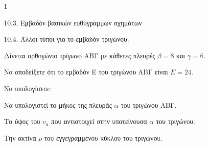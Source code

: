 \begin{ylh}{1}
    \item 10.3. Εμβαδόν βασικών ευθύγραμμων σχημάτων
    \item 10.4. Άλλοι τύποι για το εμβαδόν τριγώνου.
\end{ylh}
Δίνεται ορθογώνιο τρίγωνο ΑΒΓ με κάθετες πλευρές $\beta = 8$ και $\gamma = 6$.
\begin{alist}
\item Να αποδείξετε ότι το εμβαδόν E του τριγώνου ΑΒΓ είναι $E = 24$. 
\item Να υπολογίσετε:
    \begin{rlist}
    \item Να υπολογιστεί το μήκος της πλευράς $\alpha$ του τριγώνου ΑΒΓ. 
    \item Το ύψος του $v_a$ που αντιστοιχεί στην υποτείνουσα $\alpha$ του τριγώνου. 
    \item Την ακτίνα $\rho$ του εγγεγραμμένου κύκλου του τριγώνου. 
    \end{rlist}
\end{alist}